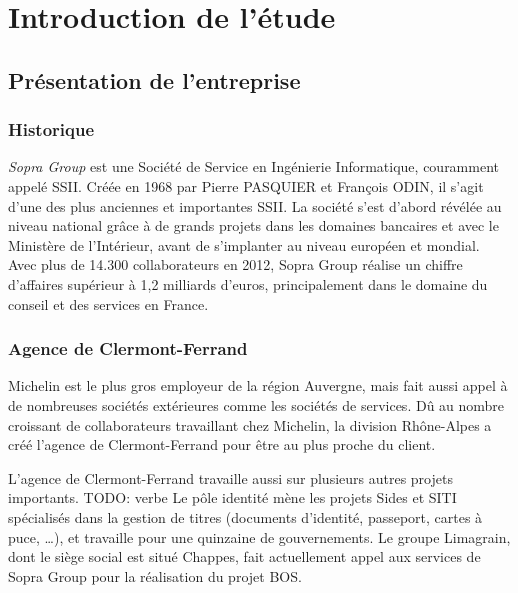 \cleardoublepage

\chapter{Introduction de l'étude}


\section{Présentation de l'entreprise}


\subsection{Historique}

\textit{Sopra Group} est une Société de Service en Ingénierie Informatique, couramment appelé SSII.
Créée en 1968 par Pierre PASQUIER et François ODIN, il s'agit d'une des plus anciennes et importantes SSII.
La société s'est d'abord révélée au niveau national grâce à de grands projets dans les domaines bancaires et avec le Ministère de l'Intérieur, avant de s'implanter au niveau européen et mondial.
Avec plus de 14.300 collaborateurs en 2012, Sopra Group réalise un chiffre d'affaires supérieur à 1,2 milliards d'euros, principalement dans le domaine du conseil et des services en France.


\subsection{Agence de Clermont-Ferrand}

Michelin est le plus gros employeur de la région Auvergne, mais fait aussi appel à de nombreuses sociétés extérieures comme les sociétés de services.
Dû au nombre croissant de collaborateurs travaillant chez Michelin, la division Rhône-Alpes a créé l'agence de Clermont-Ferrand pour être au plus proche du client.

L'agence de Clermont-Ferrand travaille aussi sur plusieurs autres projets importants.
TODO: verbe Le pôle identité mène les projets Sides et SITI spécialisés dans la gestion de titres (documents d'identité, passeport, cartes à puce, \ldots), et travaille pour une quinzaine de gouvernements.
Le groupe Limagrain, dont le siège social est situé Chappes, fait actuellement appel aux services de Sopra Group pour la réalisation du projet BOS.